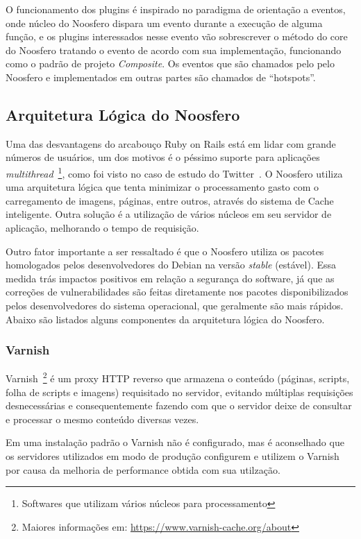O funcionamento dos plugins é inspirado no paradigma de orientação a eventos, onde núcleo do Noosfero dispara um evento durante a execução de alguma função, e os plugins interessados nesse evento vão sobrescrever o método do core do Noosfero tratando o evento de acordo com sua implementação, funcionando como o padrão de projeto \textit{Composite}. Os eventos que são chamados pelo pelo Noosfero e implementados em outras partes são chamados de “hotspots”.

\subsection{Arquitetura Lógica do Noosfero}

Uma das desvantagens do arcabouço Ruby on Rails está em lidar com grande números de usuários, um dos motivos é o péssimo suporte para aplicações \textit{multithread}~\footnote{Softwares que utilizam vários núcleos para processamento}, como foi visto no caso de estudo do Twitter~. O Noosfero utiliza uma arquitetura lógica que tenta minimizar o processamento gasto com o carregamento de imagens, páginas, entre outros, através do sistema de Cache inteligente. Outra solução é a utilização de vários núcleos em seu servidor de aplicação, melhorando o tempo de requisição.

Outro fator importante a ser ressaltado é que o Noosfero utiliza os pacotes homologados pelos desenvolvedores do Debian na versão \textit{stable} (estável). Essa medida trás impactos positivos em relação a segurança do software, já que as correções de vulnerabilidades são feitas diretamente nos pacotes disponibilizados pelos desenvolvedores do sistema operacional, que geralmente são mais rápidos. Abaixo são listados alguns componentes da arquitetura lógica do Noosfero.

\subsubsection*{Varnish}

Varnish~\footnote{Maiores informações em: \url{https://www.varnish-cache.org/about}} é um proxy HTTP reverso que armazena o conteúdo (páginas, scripts, folha de scripts e imagens) requisitado no servidor, evitando múltiplas requisições desnecessárias e consequentemente fazendo com que o servidor deixe de consultar e processar o mesmo conteúdo diversas vezes.

Em uma instalação padrão o Varnish não é configurado, mas é aconselhado que os servidores utilizados em modo de produção configurem e utilizem o Varnish por causa da melhoria de performance obtida com sua utilzação.

